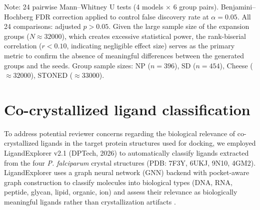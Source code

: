 \documentclass[journal=jcisd8,manuscript=suppinfo]{achemso}
\begin{document}
\begin{footnotesize}
Note: 24 pairwise Mann--Whitney U tests (4 models $\times$ 6 group pairs).
Benjamini--Hochberg FDR correction applied to control false discovery rate at $\alpha = \num{0.05}$.
All \num{24} comparisons: adjusted $p > \num{0.05}$. Given the large sample size of the expansion groups ($N \approx \num{32000}$), which creates excessive statistical power, the rank-biserial correlation ($r < \num{0.10}$, indicating negligible effect size) serves as the primary metric to confirm the absence of meaningful differences between the generated groups and the seeds.
Group sample sizes: NP ($n = \num{396}$), SD ($n = \num{454}$), Cheese ($\approx \num{32000}$), STONED ($\approx \num{33000}$).
\end{footnotesize}

\clearpage

\section*{Co-crystallized ligand classification}

To address potential reviewer concerns regarding the biological relevance of co-crystallized ligands in the target protein structures used for docking, we employed LigandExplorer v2.1 (DPTech, 2026) to automatically classify ligands extracted from the four \textit{P. falciparum} crystal structures (PDB: 7F3Y, 6UKJ, 9N10, 4GM2). LigandExplorer uses a graph neural network (GNN) backend with pocket-aware graph construction to classify molecules into biological types (DNA, RNA, peptide, glycan, lipid, organic, ion) and assess their relevance as biologically meaningful ligands rather than crystallization artifacts \cite{Li2026LigandExplorer}.
\end{document}
